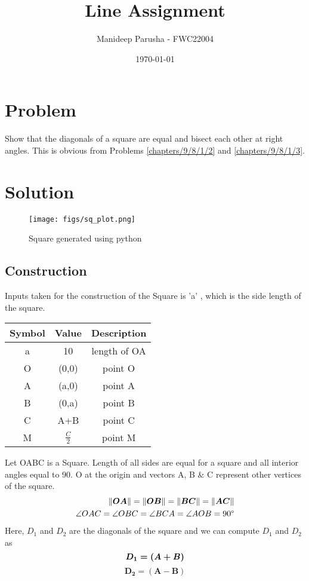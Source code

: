 \documentclass[journal,12pt,twocolumn]{article}
\title{\textbf{Line Assignment}}
\author{Manideep Parusha - FWC22004}
\date{\today}
\providecommand{\norm}[1]{\left\lVert#1\right\rVert}
\begin{document}
\maketitle
\section*{Problem}
\fi
Show that the diagonals of a square are equal and bisect each other at right angles.
\solution This is obvious from Problems
\eqref{chapters/9/8/1/2}
and
\eqref{chapters/9/8/1/3}.

\iffalse
\section*{Solution}

\begin{figure}[H]
\centering
\texttt{[image: figs/sq\_plot.png]}
\caption{Square generated using python}
\label{fig:sq_py}
\end{figure}

\subsection*{Construction}
Inputs taken for the construction of the Square is 'a' , which is the side length of the square.
\begin{table}[H]
	\centering
\setlength\extrarowheight{2pt}
	\begin{tabular}{|c|c|c|}
		\hline
		\textbf{Symbol} & \textbf{Value} & \textbf{Description} \\
		\hline
		a & 10 & length of OA\\
		\hline
		O & (0,0) & point O\\
		\hline
		A & (a,0) & point A\\
		\hline
		B & (0,a) & point B\\
		\hline
		C & A+B & point C\\
		\hline
		M & $\frac{C}{2}$ & point M\\
		\hline
	\end{tabular}
\end{table}


Let OABC is a Square. Length of all sides are equal for a square and all interior angles equal to 90\degree.
O at the origin and vectors A, B \& C represent other vertices of the square.
\begin{align}
	\norm{\boldsymbol{OA}} = \norm{\boldsymbol{OB}} = \norm{\boldsymbol{BC}} = \norm{\boldsymbol{AC}} \\
\angle OAC = \angle OBC = \angle BCA = \angle AOB = 90\degree
\label{eq-1}
\end{align}
Here, $D_1$ and $D_2$ are the diagonals of the square and we can compute $D_1$ and $D_2$ as
\begin{equation}
	\boldsymbol{D_1 = (A + B) } \\
	\label{D1eq}
\end{equation}
\begin{equation}
	\boldsymbol{D_2 = (A - B) }
	\label{D2eq}
\end{equation}
\end{document}
